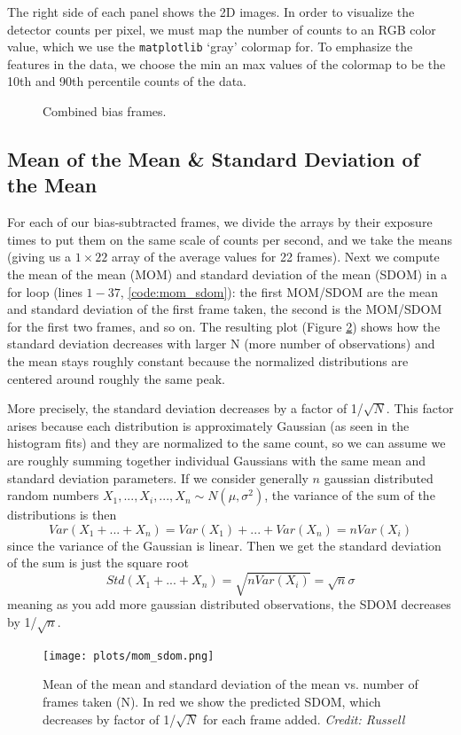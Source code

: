 \documentclass[preprint]{aastex62}
\begin{document}
The right side of each panel shows the 2D images. In order to visualize the detector counts per pixel, we must map the number of counts to an RGB color value, which we use the {\tt matplotlib} `gray' colormap for. To emphasize the features in the data, we choose the min an max values of the colormap to be the 10th and 90th percentile counts of the data.

\begin{figure}[H]
\caption{Combined bias frames.} \label{fig:bias}
\end{figure}

\subsection{Mean of the Mean \& Standard Deviation of the Mean}
For each of our bias-subtracted frames, we divide the arrays by their exposure times to put them on the same scale of counts per second, and we take the means (giving us a $1\times22$ array of the average values for 22 frames). Next we compute the mean of the mean (MOM) and standard deviation of the mean (SDOM) in a for loop (lines $1-37$, \ref{code:mom_sdom}): the first MOM/SDOM are the mean and standard deviation of the first frame taken, the second is the MOM/SDOM for the first two frames, and so on. The resulting plot (Figure \ref{fig:mom_sdom}) shows how the standard deviation decreases with larger N (more number of observations) and the mean stays roughly constant because the normalized distributions are centered around roughly the same peak.

More precisely, the standard deviation decreases by a factor of 1/$\sqrt{N}$. This factor arises because each distribution is approximately Gaussian (as seen in the histogram fits) and they are normalized to the same count, so we can assume we are roughly summing together individual Gaussians with the same mean and standard deviation parameters. If we consider generally $n$ gaussian distributed random numbers $X_1,...,X_i,...,X_n \sim N(\mu,\sigma^2)$, the variance of the sum of the distributions is then
\[Var(X_1 + ... + X_n) = Var(X_1) + ... + Var(X_n) = n Var(X_i) \]
since the variance of the Gaussian is linear. Then we get the standard deviation of the sum is just the square root
\[Std(X_1 + ... + X_n) = \sqrt{n Var(X_i)} = \sqrt{n}\sigma \]
meaning as you add more gaussian distributed observations, the SDOM decreases by 1/$\sqrt{n}$.

\begin{figure}[H]
\begin{center}
\texttt{[image: plots/mom\_sdom.png]}
\caption{Mean of the mean and standard deviation of the mean vs. number of frames taken (N). In red we show the predicted SDOM, which decreases by factor of 1/$\sqrt{N}$ for each frame added. \textit{Credit: Russell}} \label{fig:mom_sdom}
\end{center}
\end{figure}
\end{document}
